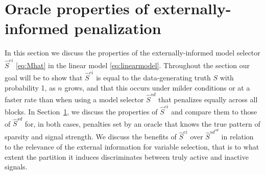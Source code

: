 \documentclass[
  12pt]{article}
\begin{document}
\section{Oracle properties of externally-informed penalization}\label{sec:properties_legression}

In this section we discuss the properties of the externally-informed model selector $\hat S^{ei}$ \eqref{eq:Mhat} in the linear model \eqref{eq:linearmodel}. Throughout the section our goal will be to show that $\hat S^{ei}$ is equal to the data-generating truth $S$ with probability 1, as $n$ grows, and that this occurs under milder conditions or at a faster rate than when using a model selector $\hat{S}^{sd}$ that penalizes equally across all blocks. In Section~\ref{sec:properties_legression}, we discuss the properties of $\hat S^{ei}$ and compare them to those of $\hat{S}^{sd}$ for, in both cases, penalties set by an oracle that knows the true pattern of sparsity and signal strength. We discuss the benefits of $\hat S^{ei}$ over $\hat{S}^{sd}^{sd}$ in relation to the relevance of the external information for variable selection, that is to what extent the partition it induces discriminates between truly active and inactive signals.
\end{document}
